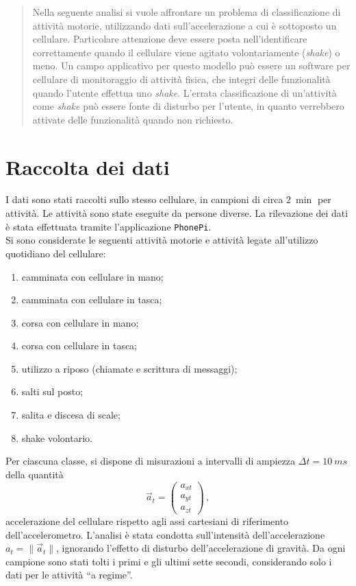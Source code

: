 \documentclass[./main.tex]{subfiles}
\begin{document}
\begin{abstract}
\normalsize\noindent
Nella seguente analisi si vuole affrontare un problema di classificazione di attività motorie, utilizzando dati sull'accelerazione a cui è sottoposto un cellulare. Particolare attenzione deve essere posta nell'identificare correttamente quando il cellulare viene agitato volontariamente ({\em shake}) o meno. Un campo applicativo per questo modello può essere un software per cellulare di monitoraggio di attività fisica, che integri delle funzionalità quando l'utente effettua uno {\em shake}. L'errata classificazione di un'attività come {\em shake} può essere fonte di disturbo per l'utente, in quanto verrebbero attivate delle funzionalità quando non richiesto.
\end{abstract}
\section{Raccolta dei dati}
I dati sono stati raccolti sullo stesso cellulare, in campioni di circa $\SI{2}{\min}$ per attività. Le attività sono state eseguite da persone diverse. La rilevazione dei dati è stata effettuata tramite l'applicazione \texttt{PhonePi}\cite{kumarPhonePiSampleServer2019}.\\
Si sono considerate le seguenti attività motorie e attività legate all\rq{}utilizzo quotidiano del cellulare:
\begin{enumerate}
	\item camminata con cellulare in mano;
	\item camminata con cellulare in tasca;
	\item corsa con cellulare in mano;
	\item corsa con cellulare in tasca;
	\item utilizzo a riposo (chiamate e scrittura di messaggi);
	\item salti sul posto;
	\item salita e discesa di scale;
	\item shake volontario.
\end{enumerate}
Per ciascuna classe, si dispone di misurazioni a intervalli di ampiezza $\Delta t = \SI{10}{ms}$ della quantità
$$
\vec{a}_t = \begin{pmatrix}
a_{xt}\\
a_{yt}\\
a_{zt}
\end{pmatrix}\,,
$$
accelerazione del cellulare rispetto agli assi cartesiani di riferimento dell'accelerometro. L'analisi è stata condotta sull'intensità dell'accelerazione $a_t = \|\vec{a}_t\|$, ignorando l'effetto di disturbo dell'accelerazione di gravità. Da ogni campione sono stati tolti i primi e gli ultimi sette secondi, considerando solo i dati per le attività ``a regime''.
\end{document}
